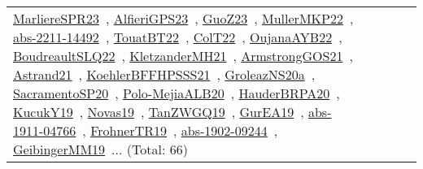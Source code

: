 {\begin{longtable}{lp{3cm}>{\raggedright\arraybackslash}p{6cm}>{\raggedright\arraybackslash}p{6cm}>{\raggedright\arraybackslash}p{8cm}}
\href{../works/MarliereSPR23.pdf}{MarliereSPR23}~\cite{MarliereSPR23}, \href{../works/AlfieriGPS23.pdf}{AlfieriGPS23}~\cite{AlfieriGPS23}, \href{../works/GuoZ23.pdf}{GuoZ23}~\cite{GuoZ23}, \href{../works/MullerMKP22.pdf}{MullerMKP22}~\cite{MullerMKP22}, \href{../works/abs-2211-14492.pdf}{abs-2211-14492}~\cite{abs-2211-14492}, \href{../works/TouatBT22.pdf}{TouatBT22}~\cite{TouatBT22}, \href{../works/ColT22.pdf}{ColT22}~\cite{ColT22}, \href{../works/OujanaAYB22.pdf}{OujanaAYB22}~\cite{OujanaAYB22}, \href{../works/BoudreaultSLQ22.pdf}{BoudreaultSLQ22}~\cite{BoudreaultSLQ22}, \href{../works/KletzanderMH21.pdf}{KletzanderMH21}~\cite{KletzanderMH21}, \href{../works/ArmstrongGOS21.pdf}{ArmstrongGOS21}~\cite{ArmstrongGOS21}, \href{../works/Astrand21.pdf}{Astrand21}~\cite{Astrand21}, \href{../works/KoehlerBFFHPSSS21.pdf}{KoehlerBFFHPSSS21}~\cite{KoehlerBFFHPSSS21}, \href{../works/GroleazNS20a.pdf}{GroleazNS20a}~\cite{GroleazNS20a}, \href{../works/SacramentoSP20.pdf}{SacramentoSP20}~\cite{SacramentoSP20}, \href{../works/Polo-MejiaALB20.pdf}{Polo-MejiaALB20}~\cite{Polo-MejiaALB20}, \href{../works/HauderBRPA20.pdf}{HauderBRPA20}~\cite{HauderBRPA20}, \href{../works/KucukY19.pdf}{KucukY19}~\cite{KucukY19}, \href{../works/Novas19.pdf}{Novas19}~\cite{Novas19}, \href{../works/TanZWGQ19.pdf}{TanZWGQ19}~\cite{TanZWGQ19}, \href{../works/GurEA19.pdf}{GurEA19}~\cite{GurEA19}, \href{../works/abs-1911-04766.pdf}{abs-1911-04766}~\cite{abs-1911-04766}, \href{../works/FrohnerTR19.pdf}{FrohnerTR19}~\cite{FrohnerTR19}, \href{../works/abs-1902-09244.pdf}{abs-1902-09244}~\cite{abs-1902-09244}, \href{../works/GeibingerMM19.pdf}{GeibingerMM19}~\cite{GeibingerMM19}... (Total: 66)\\

\end{longtable}}
